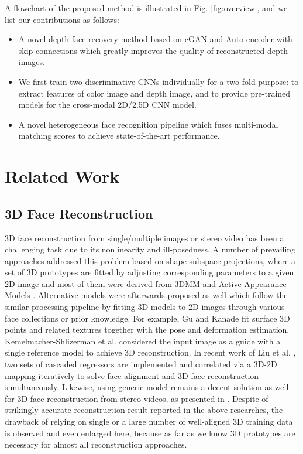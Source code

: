 \documentclass{bmvc2k}
\begin{document}
A flowchart of the proposed method is illustrated in Fig. \ref{fig:overview}, and we list our contributions as follows:
\begin{itemize}
\item A novel depth face recovery method based on cGAN and Auto-encoder with skip connections which greatly improves the quality of reconstructed depth images.
\item We first train two discriminative CNNs individually for a two-fold purpose: to extract features of color image and depth image, and to provide pre-trained models for the cross-modal 2D/2.5D CNN model. 
\item A novel heterogeneous face recognition pipeline which fuses multi-modal matching scores to achieve state-of-the-art performance.
\end{itemize}

\section{Related Work}
\subsection{3D Face Reconstruction}

3D face reconstruction from single/multiple images or stereo video has been a challenging task due to its nonlinearity and ill-posedness. A number of prevailing approaches addressed this problem based on shape-subspace projections, where a set of 3D prototypes are fitted by adjusting corresponding parameters to a given 2D image and most of them were derived from 3DMM \cite{blanz2003face} and Active Appearance Models \cite{matthews20072d}. Alternative models were afterwards proposed as well which follow the similar processing pipeline by fitting 3D models to 2D images through various face collections or prior knowledge. For example, Gu and Kanade \cite{gu20063d} fit surface 3D points and related textures together with the pose and deformation estimation. Kemelmacher-Shlizerman et al. \cite{kemelmacher20113d} considered the input image as a guide with a single reference model to achieve 3D reconstruction. In recent work of Liu et al. \cite{liu2016joint}, two sets of cascaded regressors are implemented and correlated via a 3D-2D mapping iteratively to solve face alignment and 3D face reconstruction simultaneously. Likewise, using generic model remains a decent solution as well for 3D face reconstruction from stereo videos, as presented in \cite{chowdhury20023d, fidaleo2007model,park20073d}. Despite of strikingly accurate reconstruction result reported in the above researches, the drawback of relying on single or a large number of well-aligned 3D training data is observed and even enlarged here, because as far as we know 3D prototypes are necessary for almost all reconstruction approaches.
\end{document}

